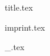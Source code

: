 \documentclass[a4paper,10pt,twocolumn,openany]{book}
\begin{document}
  \frontmatter
  {title.tex}

  \ifauthornotes
    {imprint.tex}
  \fi

  
  \twocolumn
  \mainmatter


  \setcounter{chapter}{0}



  \ifauthornotes
    {_.tex}
  \fi
\end{document}
